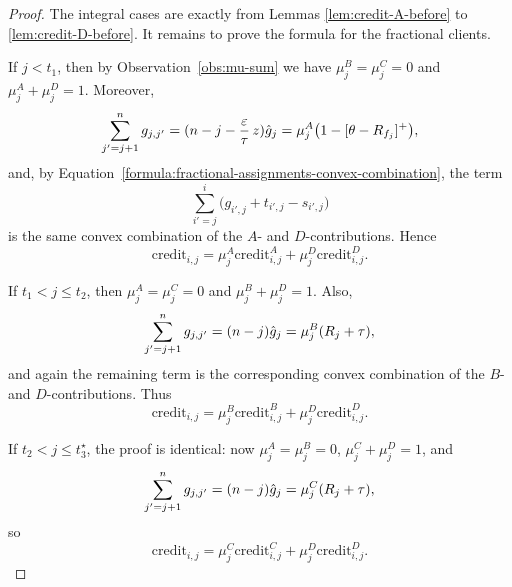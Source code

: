 \begin{proof}
    The integral cases are exactly from Lemmas \ref{lem:credit-A-before} to \ref{lem:credit-D-before}. It remains to prove the formula for the fractional clients.

    If $j<t_1$, then by Observation~\ref{obs:mu-sum} we have $\mu_j^B=\mu_j^C=0$ and $\mu_j^A+\mu_j^D=1$. Moreover,
    \begin{equation*}
        \sum_{j'=j+1}^{n} g_{j,j'}=(n-j-\frac{\varepsilon}{\tau}\, z)\hat{g}_j=
        \mu_j^A\bigl(1-[\theta-R_{f_j}]^+\bigr),
    \end{equation*}
    and, by Equation~\ref{formula:fractional-assignments-convex-combination}, the term
    \begin{equation*}
        \sum_{i'=j}^{i} \bigl(g_{i',j}+t_{i',j}-s_{i',j}\bigr)
    \end{equation*}
    is the same convex combination of the $A$- and $D$-contributions. Hence
    \begin{equation*}
        \text{credit}_{i,j}=
        \mu_j^A\text{credit}_{i,j}^A+
        \mu_j^D\text{credit}_{i,j}^D.
    \end{equation*}

    If $t_1<j\le t_2$, then $\mu_j^A=\mu_j^C=0$ and $\mu_j^B+\mu_j^D=1$. Also,
    \begin{equation*}
        \sum_{j'=j+1}^{n} g_{j,j'}=(n-j)\hat{g}_j=
        \mu_j^B(R_j+\tau),
    \end{equation*}
    and again the remaining term is the corresponding convex combination of the $B$- and $D$-contributions. Thus
    \begin{equation*}
        \text{credit}_{i,j}=
        \mu_j^B\text{credit}_{i,j}^B+
        \mu_j^D\text{credit}_{i,j}^D.
    \end{equation*}

    If $t_2<j\le t_3^\star$, the proof is identical: now $\mu_j^A=\mu_j^B=0$, $\mu_j^C+\mu_j^D=1$, and
    \begin{equation*}
        \sum_{j'=j+1}^{n} g_{j,j'}=(n-j)\hat{g}_j=
        \mu_j^C(R_j+\tau),
    \end{equation*}
    so
    \begin{equation*}
        \text{credit}_{i,j}=
        \mu_j^C\text{credit}_{i,j}^C+
        \mu_j^D\text{credit}_{i,j}^D.
    \end{equation*}


\end{proof}
